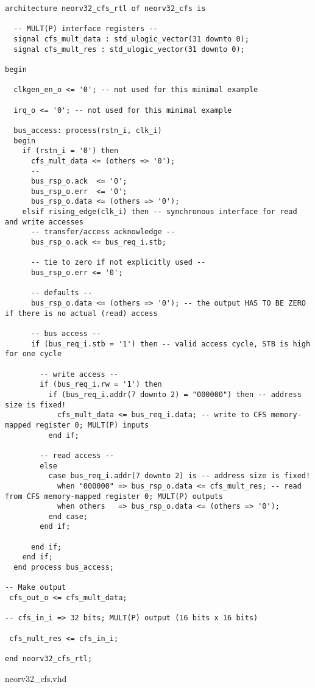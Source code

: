 \begin{code}
\begin{verbatim}
architecture neorv32_cfs_rtl of neorv32_cfs is

  -- MULT(P) interface registers --
  signal cfs_mult_data : std_ulogic_vector(31 downto 0);
  signal cfs_mult_res : std_ulogic_vector(31 downto 0);

begin

  clkgen_en_o <= '0'; -- not used for this minimal example

  irq_o <= '0'; -- not used for this minimal example

  bus_access: process(rstn_i, clk_i)
  begin
    if (rstn_i = '0') then
      cfs_mult_data <= (others => '0');
      --
      bus_rsp_o.ack  <= '0';
      bus_rsp_o.err  <= '0';
      bus_rsp_o.data <= (others => '0');
    elsif rising_edge(clk_i) then -- synchronous interface for read and write accesses
      -- transfer/access acknowledge --
      bus_rsp_o.ack <= bus_req_i.stb;

      -- tie to zero if not explicitly used --
      bus_rsp_o.err <= '0';

      -- defaults --
      bus_rsp_o.data <= (others => '0'); -- the output HAS TO BE ZERO if there is no actual (read) access

      -- bus access --
      if (bus_req_i.stb = '1') then -- valid access cycle, STB is high for one cycle

        -- write access --
        if (bus_req_i.rw = '1') then
          if (bus_req_i.addr(7 downto 2) = "000000") then -- address size is fixed!
            cfs_mult_data <= bus_req_i.data; -- write to CFS memory-mapped register 0; MULT(P) inputs
          end if;

        -- read access --
        else
          case bus_req_i.addr(7 downto 2) is -- address size is fixed!
            when "000000" => bus_rsp_o.data <= cfs_mult_res; -- read from CFS memory-mapped register 0; MULT(P) outputs
            when others   => bus_rsp_o.data <= (others => '0');
          end case;
        end if;

      end if;
    end if;
  end process bus_access;

-- Make output
 cfs_out_o <= cfs_mult_data; 

-- cfs_in_i => 32 bits; MULT(P) output (16 bits x 16 bits)

 cfs_mult_res <= cfs_in_i;

end neorv32_cfs_rtl;
\end{verbatim}
\caption{neorv32\_cfs.vhd}
\label{ap-cod:18}
\end{code}

